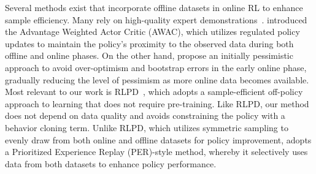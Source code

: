 Several methods exist that incorporate offline datasets in online RL to enhance sample efficiency. %
Many rely on high-quality expert demonstrations~\citep{ijspeert2002learning, kim2013learning, rajeswaran2017learning, vecerik2017leveraging, nair2018overcoming, zhu2019dexterous}. 
\citet{nair2020awac} introduced the Advantage Weighted Actor Critic (AWAC), which utilizes regulated policy updates to maintain the policy's proximity to the observed data during both offline and online phases. On the other hand, \citet{lee2022offline} propose an initially pessimistic approach to avoid over-optimism and bootstrap errors in the early online phase, gradually reducing the level of pessimism as more online data becomes available.
Most relevant to our work is RLPD~\citep{ball2023efficient}, which %
adopts a sample-efficient off-policy approach to learning that does not require pre-training. Like RLPD, our method does not depend on data quality and avoids constraining the policy with a behavior cloning term. Unlike RLPD, which utilizes symmetric sampling to evenly draw from both online and offline datasets for policy improvement, \algname adopts a Prioritized Experience Replay (PER)-style method, whereby it selectively uses data from both datasets to enhance policy performance.















